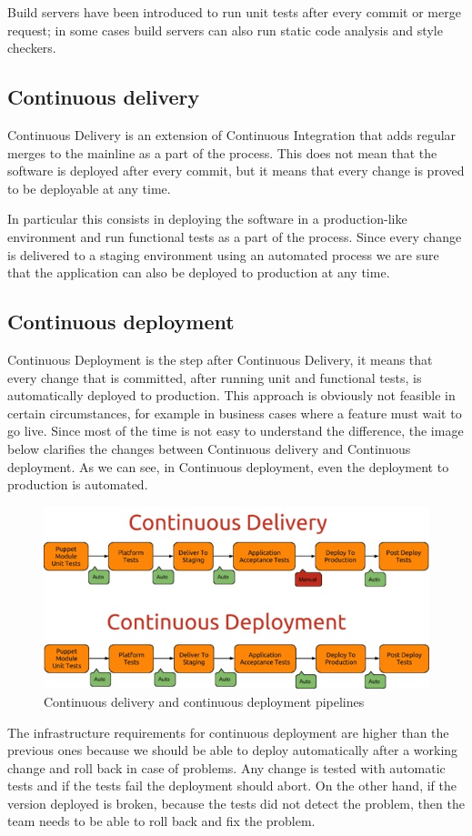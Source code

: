 Build servers have been introduced to run unit tests after every commit or
merge request; in some cases build servers can also run static code
analysis and style checkers.

\subsection{Continuous delivery}

Continuous Delivery is an extension of Continuous Integration that adds regular
merges to the mainline as a part of the process. This does not mean that the
software is deployed after every commit, but it means that every change is
proved to be deployable at any time.

In particular this consists in deploying the software in a production-like
environment and run functional tests as a part of the process. Since every
change is delivered to a staging environment using an automated process we are
sure that the application can also be deployed to production at any time.

\subsection{Continuous deployment}

Continuous Deployment is the step after Continuous Delivery, it means that
every change that is committed, after running unit and functional tests, is
automatically deployed to production. This approach is obviously not feasible
in certain circumstances, for example in business cases where a feature
must wait to go live. Since most of the time is not easy to understand the
difference, the image below clarifies the changes between Continuous
delivery and Continuous deployment. As we can see, in Continuous
deployment, even the deployment to production is automated.

\begin{figure}[H]
\includegraphics[width=\textwidth,height=\textheight,keepaspectratio]{Introduction/Continuous_Delivery_Continuous_Deployment.jpg}
\caption{Continuous delivery and continuous deployment pipelines}
\end{figure}

The infrastructure requirements for continuous deployment are higher than
the previous ones because we should be able to deploy automatically after
a working change and roll back in case of problems. Any change is tested
with automatic tests and if the tests fail the deployment should abort. On
the other hand, if the version deployed is broken, because the tests did
not detect the problem, then the team needs to be able to roll back and
fix the problem.

